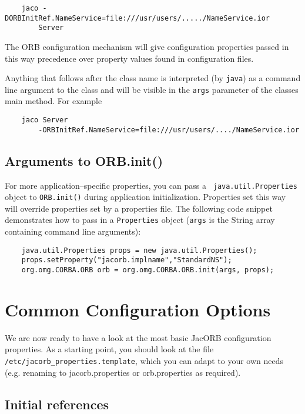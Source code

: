 \small{
\begin{verbatim}
    jaco -DORBInitRef.NameService=file:///usr/users/...../NameService.ior
        Server
\end{verbatim}

The ORB configuration mechanism will give configuration properties
passed in this way precedence over property values found in
configuration files.

Anything that follows after the class name is interpreted (by {\tt java}) as a
command line argument to the class and will be visible in the {\tt args}
parameter of the classes main method. For example

\small{
\begin{verbatim}
    jaco Server
        -ORBInitRef.NameService=file:///usr/users/..../NameService.ior
\end{verbatim}

\subsection{Arguments to ORB.init()}

For more application--specific properties, you can pass a {\tt
 java.util.Properties} object to {\tt ORB.init()} during application
initialization. Properties set this way will override properties set
by a properties file. The following code snippet demonstrates how to
pass in a {\tt Properties} object ({\tt args} is the String array
containing command line arguments):

\small{
\begin{verbatim}
    java.util.Properties props = new java.util.Properties();
    props.setProperty("jacorb.implname","StandardNS");
    org.omg.CORBA.ORB orb = org.omg.CORBA.ORB.init(args, props);
\end{verbatim}
}

\section{Common Configuration Options}

We are now ready to have a look at the most basic JacORB configuration
properties. As a starting point, you should look at the file {\tt
  /etc/jacorb\_properties.template}, which you can adapt to your own
needs (e.g. renaming to jacorb.properties or orb.properties as required).

\subsection{Initial references}

}}
